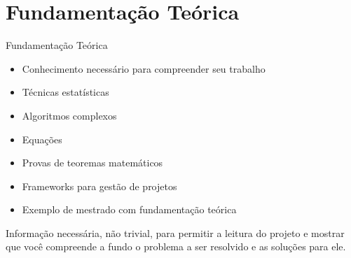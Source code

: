 \section{Fundamentação Teórica}

\begin{frame}	
	\begin{block}{Fundamentação Teórica}
		 \begin{itemize}
			  \item Conhecimento necessário para compreender seu trabalho
			  \item Técnicas estatísticas
			  \item Algoritmos complexos
			  \item Equações
			  \item Provas de teoremas matemáticos
			  \item Frameworks para gestão de projetos
			  \item Exemplo de mestrado com fundamentação teórica \href{http://www.teses.usp.br/teses/disponiveis/100/100131/tde-19042016-140611/pt-br.php}{\color{blue}{Mestrado}} 
		  \end{itemize}
	\end{block}
	
Informação necessária, não trivial, para permitir a leitura do projeto e mostrar que você compreende a fundo o problema a ser resolvido e as soluções para ele.
\end{frame}
